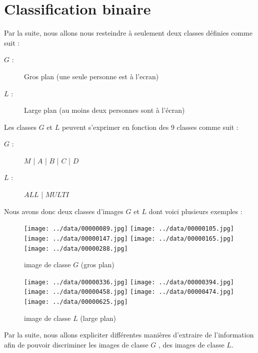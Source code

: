 \documentclass{book}
\begin{document}
\section{Classification binaire}

Par la suite, nous allons nous resteindre à seulement deux classes définies comme suit :\\
\begin{description} %
\item[$G$ :] \og Gros plan \fg{} (une seule personne est à l'ecran)
\item[$L$ :] \og Large plan \fg{} (au moins deux personnes sont à l'écran)\\
\end{description}


Les classes $G$ et $L$ peuvent s'exprimer en fonction des 9 classes comme suit :\\

\begin{description} %
\item[$G$ :] $M$ | $A$ | $B$ | $C$ | $D$
\item[$L$ :] $ALL$ | $MULTI$\\
\end{description}


Nous avons donc deux classes d'images $G$ et $L$ dont voici plusieurs exemples :\\

\begin{figure}[H]
\begin{center}
\texttt{[image: ../data/00000089.jpg]}
\texttt{[image: ../data/00000105.jpg]}
\texttt{[image: ../data/00000147.jpg]}
\texttt{[image: ../data/00000165.jpg]}
\texttt{[image: ../data/00000288.jpg]}
\end{center}
\caption{image de classe $G$ (gros plan)}
\label{classeG}
\end{figure}

\begin{figure}[H]
\begin{center}
\texttt{[image: ../data/00000336.jpg]}
\texttt{[image: ../data/00000394.jpg]}
\texttt{[image: ../data/00000458.jpg]}
\texttt{[image: ../data/00000474.jpg]}
\texttt{[image: ../data/00000625.jpg]}
\end{center}
\caption{image de classe $L$ (large plan)}
\label{classeL}
\end{figure}

Par la suite, nous allons expliciter différentes manières d'extraire de l'information afin de pouvoir discriminer les images de classe $G$
, des images de classe $L$.
\end{document}
